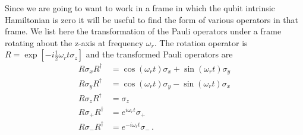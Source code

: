 Since we are going to want to work in a frame in which the qubit intrinsic Hamiltonian is zero it will be useful to find the form of various operators in that frame.
We list here the transformation of the Pauli operators under a frame rotating about the z-axis at frequency $\omega_r$.
The rotation operator is $R=\exp \left[-i \frac{1}{2} \omega_r t \sigma_z \right]$  and the transformed Pauli operators are \begin{align}
R\sigma_xR^{\dagger} & = \cos(\omega_r t)\sigma_x + \sin(\omega_r t) \sigma_y \nonumber \\
R\sigma_yR^{\dagger} & = \cos(\omega_r t)\sigma_y - \sin(\omega_r t) \sigma_x \nonumber \\
R\sigma_zR^{\dagger} & = \sigma_z \nonumber \\
R\sigma_+R^{\dagger} & = e^{i\omega_r t}\sigma_+ \nonumber \\
R\sigma_-R^{\dagger} & = e^{-i\omega_r t}\sigma_- \, . \nonumber \end{align}



